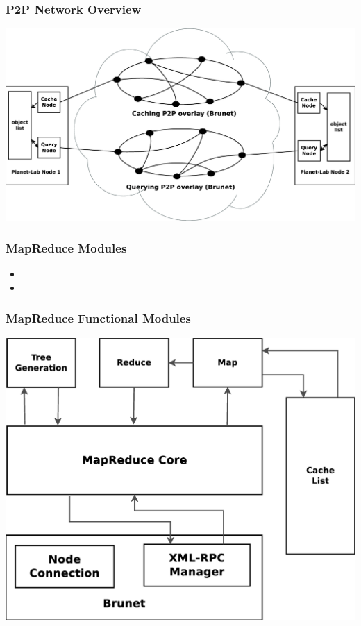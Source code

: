 \documentclass[red]{beamer}
\begin{document}
\begin{frame}
\frametitle{P2P Network Overview}
\begin{center}
\includegraphics[scale=0.17]{figs/brunet}
\end{center}
\end{frame}

\begin{frame}
\frametitle{MapReduce Modules}
\begin{itemize}
\item 
\item 
\end{itemize}
\end{frame}

\begin{frame}
\frametitle{MapReduce Functional Modules}
\begin{center}
\includegraphics[scale=0.2]{figs/mapreduce_query_system}
\end{center}
\end{frame}
\end{document}
